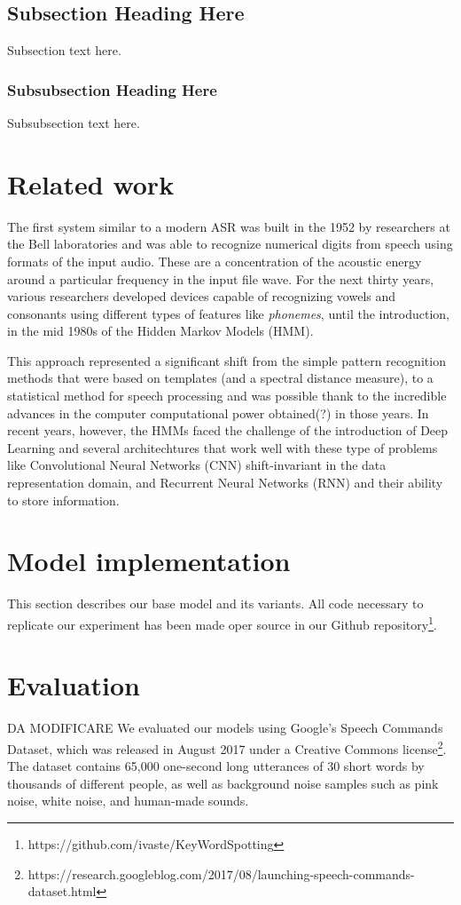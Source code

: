\documentclass[conference]{IEEEtran}
\begin{document}
\subsection{Subsection Heading Here}
Subsection text here.


\subsubsection{Subsubsection Heading Here}
Subsubsection text here.

\section{Related work}
The first system similar to a modern ASR was built in the 1952 by researchers at the Bell laboratories and was able to recognize numerical digits from speech using formats of the input audio. These are a concentration of the acoustic energy around a particular frequency in the input file wave. For the next thirty years, various researchers developed devices capable of recognizing vowels and consonants using different types of features like \textit{phonemes}, until the introduction, in the mid 1980s of the Hidden Markov Models (HMM). 

This approach represented a significant shift from the simple pattern recognition methods that were based on templates (and a spectral distance measure), to a statistical method for speech processing and was possible thank to the incredible advances in the computer computational power obtained(?) in those years. In recent years, however, the HMMs faced the challenge of the introduction of Deep Learning and several architechtures that work well with these type of problems like Convolutional Neural Networks (CNN) shift-invariant in the data representation domain, and Recurrent Neural Networks (RNN) and their ability to store information.
\section{Model implementation}
This section describes our base model and its variants. All code necessary to replicate our experiment has been made oper source in our Github repository\footnote{https://github.com/ivaste/KeyWordSpotting}.
\section{Evaluation}
DA MODIFICARE We evaluated our models using Google’s Speech Commands Dataset, which was released in August 2017 under a Creative Commons license\footnote{https://research.googleblog.com/2017/08/launching-speech-commands-dataset.html}. The dataset contains 65,000
one-second long utterances of 30 short words by thousands of
different people, as well as background noise samples such as
pink noise, white noise, and human-made sounds.
\end{document}
